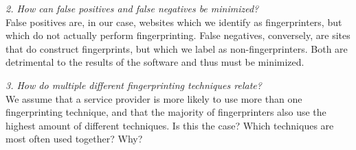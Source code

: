 \documentclass[
    fontsize=12pt,
    headings=small,
    parskip=half,
    bibliography=totoc,
    numbers=noenddot,
    open=any
    ]{scrreprt}
\begin{document}
\textit{2. How can false positives and false negatives be minimized?}\\
False positives are, in our case, websites which we identify as fingerprinters, but which do not actually
perform fingerprinting. False negatives, conversely, are sites that do construct fingerprints, but which we
label as non-fingerprinters.
Both are detrimental to the results of the software and thus must be minimized.

\textit{3. How do multiple different fingerprinting techniques relate?}\\
We assume that a service provider is more likely to use more than one fingerprinting technique,
and that the majority of fingerprinters also use the highest amount of different techniques.
Is this the case? Which techniques are most often used together? Why?
\end{document}
